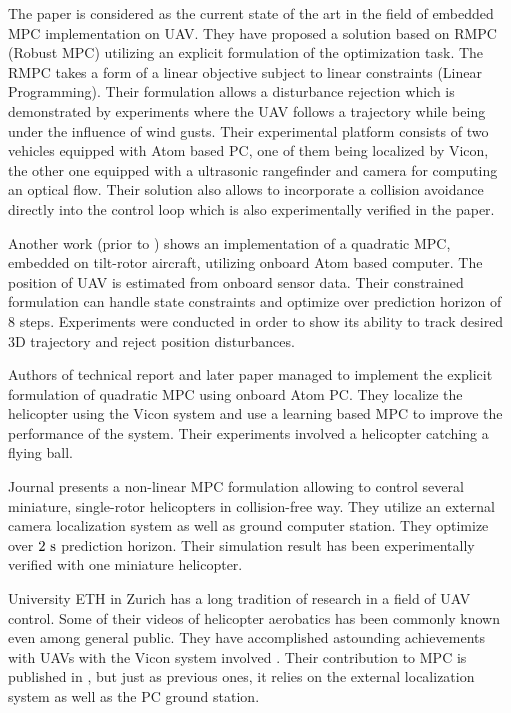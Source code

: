 The paper \citep{alexis2014rmpc} is considered as the current state of the art in the field of embedded MPC implementation on UAV. They have proposed a solution based on RMPC (Robust MPC)  utilizing an explicit formulation of the optimization task. The RMPC takes a form of a linear objective subject to linear constraints (Linear Programming). Their formulation allows a disturbance rejection which is demonstrated by experiments where the UAV follows a trajectory while being under the influence of wind gusts. Their experimental platform consists of two vehicles equipped with Atom based PC, one of them being localized by Vicon, the other one equipped with a ultrasonic rangefinder and camera for computing an optical flow. Their solution also allows to incorporate a collision avoidance directly into the control loop which is also experimentally verified in the paper.

Another work \citep{papachristos2013} (prior to \citep{alexis2014rmpc}) shows an implementation of a quadratic MPC, embedded on tilt-rotor aircraft, utilizing onboard Atom based computer. The position of UAV is estimated from onboard sensor data. Their constrained formulation can handle state constraints and optimize over prediction horizon of 8 steps. Experiments were conducted in order to show its ability to track desired 3D trajectory and reject position disturbances.

Authors of technical report \citep{bouffard2012dtic} and later paper \citep{bouffard2012learning} managed to implement the explicit formulation of quadratic MPC using onboard Atom PC. They localize the helicopter using the Vicon system and use a learning based MPC to improve the performance of the system. Their experiments involved a helicopter catching a flying ball.

Journal \cite{suzuki2014collision} presents a non-linear MPC formulation allowing to control several miniature, single-rotor helicopters in collision-free way. They utilize an external camera localization system as well as ground computer station. They optimize over $2 ~\mathrm{s}$ prediction horizon. Their simulation result has been experimentally verified with one miniature helicopter.

University ETH in Zurich has a long tradition of research in a field of UAV control. Some of their videos of helicopter aerobatics has been commonly known even among general public. They have accomplished astounding achievements with UAVs with the Vicon system involved \citep{brescianini2013polearobatics, Augugliaro2013buildingstructures}. Their contribution to MPC is published in \citep{ethMueller2013mpc}, but just as previous ones, it relies on the external localization system as well as the PC ground station.

